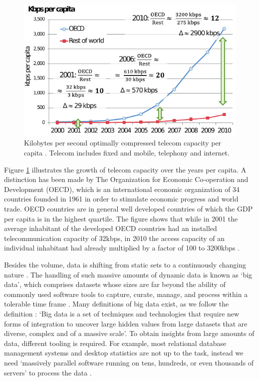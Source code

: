 \begin{figure}[ht!]
\centering
\includegraphics[width=\textwidth]{figures/kbpspercapita.pdf}
\caption[Telecom capacity per capita]{Kilobytes per second optimally compressed telecom capacity per capita \cite{SIGN:SIGN584}. Telecom includes fixed and mobile, telephony and internet. \label{fig:growth}}
\end{figure}

Figure \ref{fig:growth} illustrates the growth of telecom capacity over the years per capita. A distinction has been made by The Organization for Economic Co-operation and Development (OECD), which is an international economic organization of 34 countries founded in 1961 in order to stimulate economic progress and world trade. OECD countries are in general well developed countries of which the GDP per capita is in the highest quartile. The figure shows that while in 2001 the average inhabitant of the developed OECD countries had an installed telecommunication capacity of 32kbps, in 2010 the access capacity of an individual inhabitant had already multiplied by a factor of 100 to 3200kbps \cite{SIGN:SIGN584}.

Besides the volume, data is shifting from static sets to a continuously changing nature \cite{1558609016}. The handling of such massive amounts of dynamic data is known as `big data', which comprises datasets whose sizes are far beyond the ability of commonly used software tools to capture, curate, manage, and process within a tolerable time frame \cite{bigdata}. Many definitions of big data exist, as we follow the definition \cite{Hashem201598}: `Big data is a set of techniques and technologies that require new forms of integration to uncover large hidden values from large datasets that are diverse, complex and of a massive scale'. To obtain insights from large amounts of data, different tooling is required. For example, most relational database management systems and desktop statistics are not up to the task, instead we need `massively parallel software running on tens, hundreds, or even thousands of servers' to process the data \cite{Jacobs:2009:PBD:1536616.1536632}.

